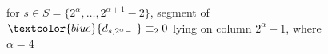 
\begin{figure}[p]

    \noindent{}

    \captionsetup{singlelinecheck=off}
    \caption[.]{for $s\in S=\lbrace2^{\alpha},\ldots,2^{\alpha+1}-2\rbrace$, segment of 
        $\textcolor{blue}{d_{s,2^{\alpha}-1}}\equiv_{2}0$ lying on column $2^{\alpha}-1$,
        where $\alpha=4$}



    \label{fig:mirror-segment}

\end{figure}
